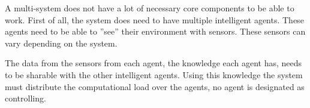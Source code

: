 
A multi-system does not have a lot of necessary core components to be able to work. First
of all, the system does need to have multiple intelligent agents. These agents need to be
able to ”see” their environment with sensors. These sensors can vary depending on the
system.

The data from the sensors from each agent, the knowledge each agent has, needs to be
sharable with the other intelligent agents. Using this knowledge the system must distribute
the computational load over the agents, no agent is designated as controlling.